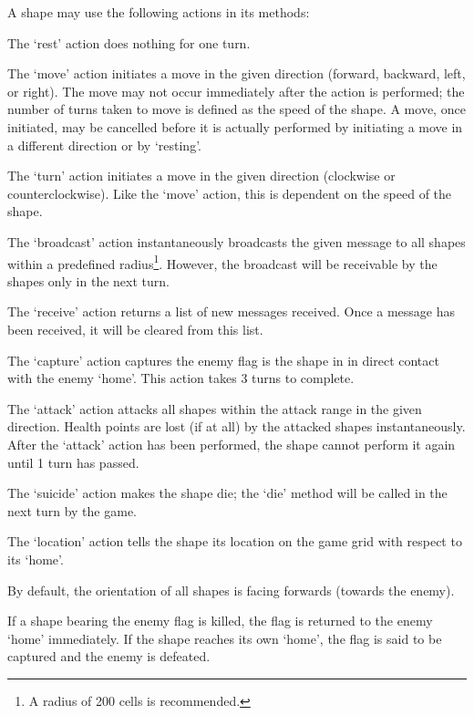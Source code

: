 \documentclass[a4paper,11pt]{article}
\begin{document}
A shape may use the following actions in its methods:
\begin{description}
\addtolength{\itemsep}{-4pt}
    \item[rest] The `rest' action does nothing for one turn.
    \item[move(direction)] The `move' action initiates a move in the given direction (forward, backward, left, or right). The move may not occur immediately after the action is performed; the number of turns taken to move is defined as the \textsf{speed} of the shape. A move, once initiated, may be cancelled before it is actually performed by initiating a move in a different direction or by `resting'.
    \item[turn(direction)] The `turn' action initiates a move in the given direction (clockwise or counterclockwise). Like the `move' action, this is dependent on the \textsf{speed} of the shape.
    \item[broadcast(message)] The `broadcast' action instantaneously broadcasts the given message to all shapes within a predefined radius\footnote{A radius of 200 cells is recommended.}. However, the broadcast will be receivable by the shapes only in the next turn.
    \item[receive] The `receive' action returns a list of new messages received. Once a message has been received, it will be cleared from this list.
    \item[capture] The `capture' action captures the enemy flag is the shape in in direct contact with the enemy `home'. This action takes 3 turns to complete.
    \item[attack(direction)] The `attack' action attacks all shapes within the \textsf{attack range} in the given direction. Health points are lost (if at all) by the attacked shapes instantaneously. After the `attack' action has been performed, the shape cannot perform it again until 1 turn has passed.
    \item[suicide] The `suicide' action makes the shape die; the `die' method will be called in the next turn by the game.
    \item[location] The `location' action tells the shape its location on the game grid with respect to its `home'.
\end{description}

By default, the orientation of all shapes is facing forwards (towards the enemy).

If a shape bearing the enemy flag is killed, the flag is returned to the enemy `home' immediately. If the shape reaches its own `home', the flag is said to be captured and the enemy is defeated.
\end{document}
